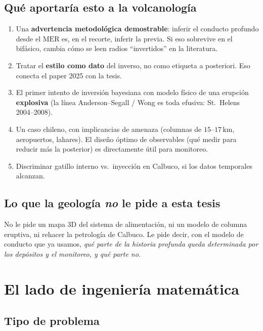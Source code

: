 \documentclass[11pt,a4paper]{article}
\theoremstyle{plain}
\theoremstyle{definition}
\theoremstyle{remark}
\newcommand{\MER}{\mathrm{MER}}
\begin{document}
\subsection{Qué aportaría esto a la volcanología}

\begin{enumerate}
\item Una \textbf{advertencia metodológica demostrable}: inferir el
  conducto profundo desde el $\MER$ es, en el recorte, inferir la
  previa. Si eso sobrevive en el bifásico, cambia cómo se leen
  radios ``invertidos'' en la literatura.
\item Tratar el \textbf{estilo como dato} del inverso, no como
  etiqueta a posteriori. Eso conecta el paper 2025 con la tesis.
\item El primer intento de inversión bayesiana con modelo físico de
  una erupción \textbf{explosiva} (la línea Anderson--Segall / Wong
  es toda efusiva: St.\ Helens 2004--2008).
\item Un caso chileno, con implicancias de amenaza (columnas de
  $15$--$17\,\mathrm{km}$, aeropuertos, lahares). El diseño óptimo
  de observables (qué medir para reducir más la posterior) es
  directamente útil para monitoreo.
\item Discriminar gatillo interno vs.\ inyección en Calbuco, si los
  datos temporales alcanzan.
\end{enumerate}

\subsection{Lo que la geología \emph{no} le pide a esta tesis}

No le pide un mapa 3D del sistema de alimentación, ni un modelo de
columna eruptiva, ni rehacer la petrología de Calbuco. Le pide
decir, con el modelo de conducto que ya usamos, \emph{qué parte de
la historia profunda queda determinada por los depósitos y el
monitoreo, y qué parte no}.

\section{El lado de ingeniería matemática}
\label{sec:math}

\subsection{Tipo de problema}
\end{document}

